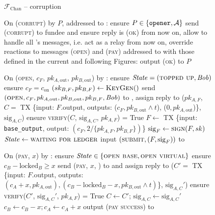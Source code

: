 \begin{figure}[H]
  \begin{systembox}{$\mathcal{F}_{\mathrm{Chan}}$ -- corruption}
    \begin{algorithmic}[1]
      \State On (\textsc{corrupt}) by $P$, addressed to \alice:
      \Indent
        \State ensure $P \in \{\mathtt{opener}, \mathcal{A}\}$
          \State send (\textsc{corrupt}) to fundee and ensure reply is
          (\textsc{ok})
        \EndFor
        \State from now on, allow \adversary to handle all \alice's messages,
        i.e. act as a relay
          \State from now on, override reactions to messages (\textsc{open}) and
          (\textsc{pay}) addressed to \bob
          with those defined in the current and following Figures:
        \EndIf
        \State output (\textsc{ok}) to $P$
      \EndIndent
      \Statex

      \State On (\textsc{open}, $c_F$, $pk_{A, \mathrm{out}}$, $pk_{B,
      \mathrm{out}}$) by \bob:
      \Indent
        \State ensure $\mathit{State} = (\textsc{topped up}, \mathit{Bob})$ 
        \State ensure $c_F = c_{\mathrm{on}}$
        \State $(sk_{B, F}, pk_{B, F}) \gets \textsc{KeyGen}()$
        \State send $(\textsc{open}, c_F, pk_{A, \mathrm{out}}, pk_{B,
        \mathrm{out}}, pk_{B, F}, \mathit{Bob})$ to \adversary, assign reply to ($pk_{A,
        F}$, $C =$ TX \{input: $F$.output, outputs: ($c_F, pk_{B, \mathrm{out}}
        \wedge t$), ($0, pk_{A, \mathrm{out}}$)\}, $\mathrm{sig}_{A, C}$)
        \State ensure \textsc{verify}($C$, $\mathrm{sig}_{A, C}$, $pk_{A, F}$) =
        True
        \State $F \gets$ TX \{input: \texttt{base\_output}, output: $(c_F,
        2/\{pk_{A, F}, pk_{B, F}\})$\}
        \State $\mathrm{sig}_F \gets \textsc{sign}(F, sk)$
        \State $\mathit{State} \gets \textsc{waiting for ledger}$
        \State input $(\textsc{submit}, (F, \mathrm{sig}_F))$ to \ledger
      \EndIndent
      \Statex

      \State On (\textsc{pay}, $x$) by \bob:
      \Indent
        \State ensure $\mathit{State} \in \{\textsc{open base}, \textsc{open
        virtual}\}$
        \State ensure $c_B - \mathrm{locked}_B \geq x$
        \State send (\textsc{pay}, $x$, \bob) to \adversary and assign reply to
        ($C' =$ TX \{input: $F$.output, outputs: $(c_A + x, pk_{A, \mathrm{out}}),
        (c_B - \mathrm{locked}_B - x, pk_{B, \mathrm{out}} \wedge t)$\},
        $\mathrm{sig}_{A, C}'$) 
        \State ensure \textsc{verify}($C'$, $\mathrm{sig}_{A, C}'$, $pk_{A, F}$)
        = True
        \State $C \gets C'$; $\mathrm{sig}_{A, C} \gets \mathrm{sig}_{A, C}'$
        \State $c_B \gets c_B - x; c_A \gets c_A + x$
        \State output (\textsc{pay success}) to \bob
      \EndIndent
    \end{algorithmic}
  \end{systembox}
  \caption{}
  \label{code:functionality:chan:skeleton:corruption}
\end{figure}
